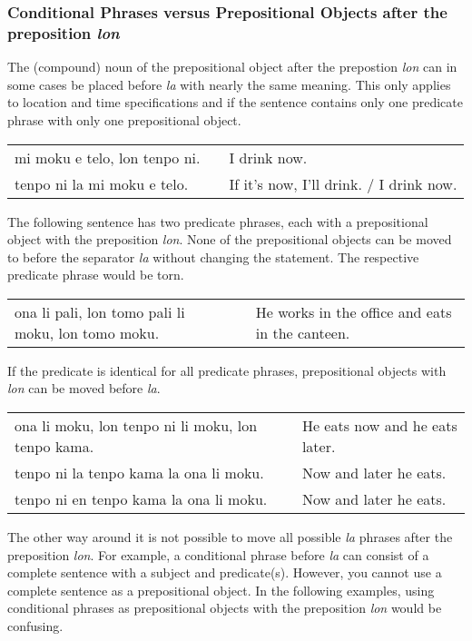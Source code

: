 %
%
\subsubsection*{Conditional Phrases versus Prepositional Objects after the preposition \textit{lon} }
%
The (compound) noun of the prepositional object after the prepostion \textit{lon} can in some cases be placed before \textit{la} with nearly the same meaning.
This only applies to location and time specifications and if the sentence contains only one predicate phrase with only one prepositional object. 

\begin{supertabular}{p{5,5cm}|ll}
mi moku e telo, lon tenpo ni. && I drink now. \\
tenpo ni la mi moku e telo.  && If it's now, I'll drink. / I drink now. \\
\end{supertabular} 

The following sentence has two predicate phrases, each with a prepositional object with the preposition \textit{lon}. 
None of the prepositional objects can be moved to before the separator \textit{la} without changing the statement. 
The respective predicate phrase would be torn.

\begin{supertabular}{p{5,5cm}|ll}
ona li pali, lon tomo pali li moku, lon tomo moku. && He works in the office and eats in the canteen.  \\
\end{supertabular}

If the predicate is identical for all predicate phrases, prepositional objects with \textit{lon} can be moved before \textit{la}.

\begin{supertabular}{p{5,5cm}|ll}
ona li moku, lon tenpo ni li moku, lon tenpo kama. && He eats now and he eats later. \\
tenpo ni la tenpo kama la ona li moku. && Now and later he eats. \\
tenpo ni en tenpo kama la ona li moku. && Now and later he eats. \\
\end{supertabular}

The other way around it is not possible to move all possible \textit{la} phrases after the preposition \textit{lon}. 
For example, a conditional phrase before \textit{la} can consist of a complete sentence with a subject and predicate(s). 
However, you cannot use a complete sentence as a prepositional object.
In the following examples, using conditional phrases as prepositional objects with the preposition \textit{lon} would be confusing. 

